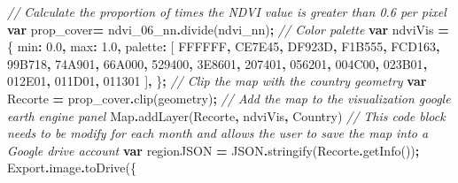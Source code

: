 \documentclass[
  10pt,
  b5paper,
]{book}
\newenvironment{Shaded}{\begin{snugshade}}{\end{snugshade}}
\newcommand{\AttributeTok}[1]{\textcolor[rgb]{0.77,0.63,0.00}{#1}}
\newcommand{\BuiltInTok}[1]{#1}
\newcommand{\CommentTok}[1]{\textcolor[rgb]{0.56,0.35,0.01}{\textit{#1}}}
\newcommand{\DataTypeTok}[1]{\textcolor[rgb]{0.13,0.29,0.53}{#1}}
\newcommand{\FloatTok}[1]{\textcolor[rgb]{0.00,0.00,0.81}{#1}}
\newcommand{\FunctionTok}[1]{\textcolor[rgb]{0.00,0.00,0.00}{#1}}
\newcommand{\KeywordTok}[1]{\textcolor[rgb]{0.13,0.29,0.53}{\textbf{#1}}}
\newcommand{\NormalTok}[1]{#1}
\newcommand{\OperatorTok}[1]{\textcolor[rgb]{0.81,0.36,0.00}{\textbf{#1}}}
\newcommand{\StringTok}[1]{\textcolor[rgb]{0.31,0.60,0.02}{#1}}
\begin{document}
\begin{Shaded}
\begin{Highlighting}[]
 \CommentTok{// Calculate the proportion of times the NDVI value is greater than 0.6 per pixel}
\KeywordTok{var}\NormalTok{ prop\_cover}\OperatorTok{=}\NormalTok{ ndvi\_06\_nn}\OperatorTok{.}\FunctionTok{divide}\NormalTok{(ndvi\_nn)}\OperatorTok{;}
 \CommentTok{// Color palette}
\KeywordTok{var}\NormalTok{ ndviVis }\OperatorTok{=}\NormalTok{ \{}
  \DataTypeTok{min}\OperatorTok{:} \FloatTok{0.0}\OperatorTok{,}
  \DataTypeTok{max}\OperatorTok{:} \FloatTok{1.0}\OperatorTok{,}
  \DataTypeTok{palette}\OperatorTok{:}\NormalTok{ [}
    \StringTok{\textquotesingle{}FFFFFF\textquotesingle{}}\OperatorTok{,} \StringTok{\textquotesingle{}CE7E45\textquotesingle{}}\OperatorTok{,} \StringTok{\textquotesingle{}DF923D\textquotesingle{}}\OperatorTok{,} \StringTok{\textquotesingle{}F1B555\textquotesingle{}}\OperatorTok{,} \StringTok{\textquotesingle{}FCD163\textquotesingle{}}\OperatorTok{,} \StringTok{\textquotesingle{}99B718\textquotesingle{}}\OperatorTok{,} \StringTok{\textquotesingle{}74A901\textquotesingle{}}\OperatorTok{,}
    \StringTok{\textquotesingle{}66A000\textquotesingle{}}\OperatorTok{,} \StringTok{\textquotesingle{}529400\textquotesingle{}}\OperatorTok{,} \StringTok{\textquotesingle{}3E8601\textquotesingle{}}\OperatorTok{,} \StringTok{\textquotesingle{}207401\textquotesingle{}}\OperatorTok{,} \StringTok{\textquotesingle{}056201\textquotesingle{}}\OperatorTok{,} \StringTok{\textquotesingle{}004C00\textquotesingle{}}\OperatorTok{,} \StringTok{\textquotesingle{}023B01\textquotesingle{}}\OperatorTok{,}
    \StringTok{\textquotesingle{}012E01\textquotesingle{}}\OperatorTok{,} \StringTok{\textquotesingle{}011D01\textquotesingle{}}\OperatorTok{,} \StringTok{\textquotesingle{}011301\textquotesingle{}}
\NormalTok{ ]}\OperatorTok{,}
\NormalTok{\}}\OperatorTok{;}
 \CommentTok{// Clip the map with the country geometry}
\KeywordTok{var}\NormalTok{ Recorte }\OperatorTok{=}\NormalTok{ prop\_cover}\OperatorTok{.}\FunctionTok{clip}\NormalTok{(geometry)}\OperatorTok{;}
 \CommentTok{// Add the map to the visualization google earth engine panel}
\BuiltInTok{Map}\OperatorTok{.}\FunctionTok{addLayer}\NormalTok{(Recorte}\OperatorTok{,}\NormalTok{ ndviVis}\OperatorTok{,} \StringTok{\textquotesingle{}Country\textquotesingle{}}\NormalTok{)}
 \CommentTok{// This code block needs to be modify for each month and allows the user to save the map into a Google drive account}
\KeywordTok{var}\NormalTok{ regionJSON }\OperatorTok{=} \BuiltInTok{JSON}\OperatorTok{.}\FunctionTok{stringify}\NormalTok{(Recorte}\OperatorTok{.}\FunctionTok{getInfo}\NormalTok{())}\OperatorTok{;}
\NormalTok{Export}\OperatorTok{.}\AttributeTok{image}\OperatorTok{.}\FunctionTok{toDrive}\NormalTok{(\{}

\end{Highlighting}
\end{Shaded}
\end{document}
